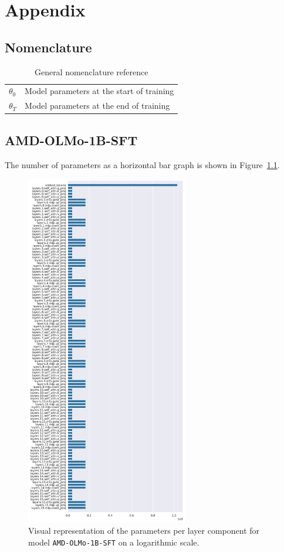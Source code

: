 \chapter{Appendix}
\section{Nomenclature}
\begin{table}[htb]
    \centering
    \begin{tabular}{ll}
        $\theta_0$ & Model parameters at the start of training \\ 
        $\theta_T$ & Model parameters at the end of training \\
    \end{tabular}
    \caption{General nomenclature reference}
    \label{tab:nomenclature}
\end{table}

\section{AMD-OLMo-1B-SFT}
The number of parameters as a horizontal bar graph is shown in Figure~\ref{fig:parameters_per_layer_amd_olmo}.
\begin{figure}[ht]
    \centering
    \includegraphics[width=0.63\textwidth]{figures/parameters_per_layer.png}
    \caption{Visual representation of the parameters per layer component for model \texttt{AMD-OLMo-1B-SFT} on a logarithmic scale.}
    \label{fig:parameters_per_layer_amd_olmo}
\end{figure}

